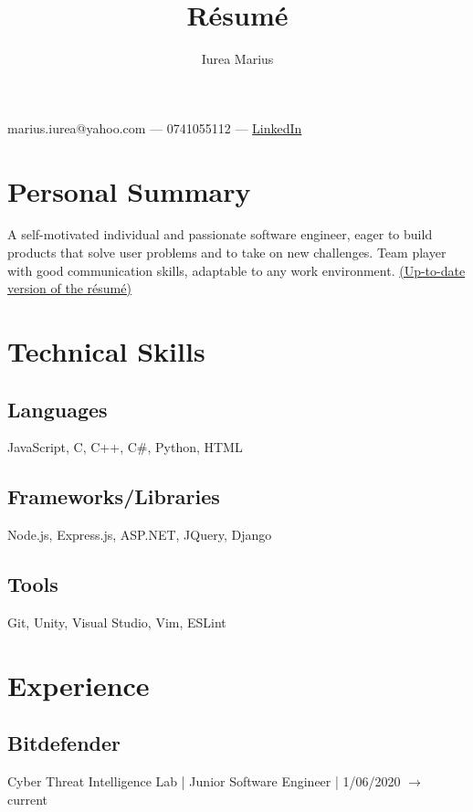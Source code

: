 \documentclass[a4paper,hidelinks,8pt]{article}
\begin{document}
\title{R\'esum\'e}
\author{Iurea Marius}
\renewcommand{\maketitle}
{
\begin{center}
        {\huge\bfseries
        \thetitle

        \theauthor}

        marius.iurea@yahoo.com --- 0741055112 --- \href{https://www.linkedin.com/in/marius-iurea-49b7021b5/}{LinkedIn}

        \end{center}
}

\maketitle

\section{Personal Summary}
A self-motivated individual and passionate software engineer, eager to build products that solve user problems and to take on new challenges.
Team player with good communication skills, adaptable to any work environment. \href{https://github.com/IureaMarius/Resume/blob/master/Resume.pdf}{(Up-to-date version of the r\'esum\'e)}
\section{Technical Skills}
\subsection{Languages}
JavaScript, C, C++, C\#, Python, HTML
\subsection{Frameworks/Libraries}
Node.js, Express.js, ASP.NET, JQuery, Django
\subsection{Tools}
Git, Unity, Visual Studio, Vim, ESLint
\section{Experience}
\subsection{Bitdefender}Cyber Threat Intelligence Lab | Junior Software Engineer | 1/06/2020 $\rightarrow$ current
\end{document}

